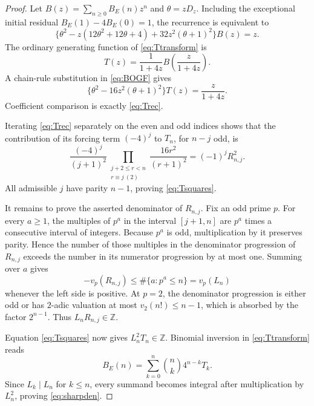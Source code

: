 \documentclass[11pt]{article}
\theoremstyle{definition}
\theoremstyle{remark}
\begin{document}
\begin{proof}
Let $B(z)=\sum_{n\ge0}B_E(n)z^n$ and $\theta=zD_z$.  Including the exceptional
initial residual $B_E(1)-4B_E(0)=1$, the recurrence is equivalent to
\begin{equation}\label{eq:BOGF}
 \bigl\{\theta^2-z(12\theta^2+12\theta+4)
       +32z^2(\theta+1)^2\bigr\}B(z)=z.
\end{equation}
The ordinary generating function of \eqref{eq:Ttransform} is
\begin{equation}\label{eq:TOGF}
 T(z)=\frac1{1+4z}B\!\left(\frac z{1+4z}\right).
\end{equation}
A chain-rule substitution in \eqref{eq:BOGF} gives
\[
 \{\theta^2-16z^2(\theta+1)^2\}T(z)=\frac z{1+4z}.
\]
Coefficient comparison is exactly \eqref{eq:Trec}.

Iterating \eqref{eq:Trec} separately on the even and odd indices shows that the
contribution of its forcing term $(-4)^j$ to $T_n$, for $n-j$ odd, is
\[
 \frac{(-4)^j}{(j+1)^2}
 \prod_{\substack{j+2\le r<n\\r\equiv j\ (2)}}
 \frac{16r^2}{(r+1)^2}=(-1)^jR_{n,j}^2.
\]
All admissible $j$ have parity $n-1$, proving \eqref{eq:Tsquares}.

It remains to prove the asserted denominator of $R_{n,j}$.  Fix an odd prime $p$.
For every $a\ge1$, the multiples of $p^a$ in the interval $[j+1,n]$ are $p^a$
times a consecutive interval of integers.  Because $p^a$ is odd, multiplication by it
preserves parity.  Hence the number of those multiples in the denominator progression
of $R_{n,j}$ exceeds the number in its numerator progression by at most one.  Summing
over $a$ gives
\[
 -v_p(R_{n,j})\le \#\{a:p^a\le n\}=v_p(L_n)
\]
whenever the left side is positive.  At $p=2$, the denominator progression is either
odd or has $2$-adic valuation at most $v_2(n!)\le n-1$, which is absorbed by the
factor $2^{n-1}$.  Thus $L_nR_{n,j}\in\mathbb Z$.

Equation \eqref{eq:Tsquares} now gives $L_n^2T_n\in\mathbb Z$.  Binomial inversion in
\eqref{eq:Ttransform} reads
\[
 B_E(n)=\sum_{k=0}^n\binom nk4^{n-k}T_k.
\]
Since $L_k\mid L_n$ for $k\le n$, every summand becomes integral after multiplication
by $L_n^2$, proving \eqref{eq:sharpden}.
\end{proof}
\end{document}
